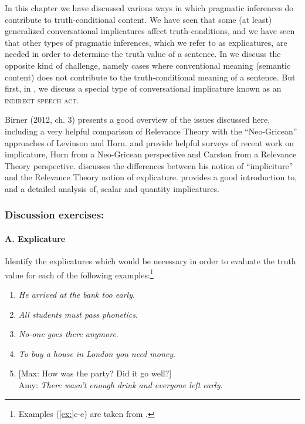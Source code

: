 In this chapter we have discussed various ways in which pragmatic inferences do contribute to truth-conditional content. We have seen that some (at least) generalized conversational implicatures affect truth-conditions, and we have seen that other types of pragmatic inferences, which we refer to as explicatures, are needed in order to determine the truth value of a sentence. In  we discuss the opposite kind of challenge, namely cases where conventional meaning (semantic content) does not contribute to the truth-conditional meaning of a sentence. But first, in , we discuss a special type of conversational implicature known as an \textsc{indirect speech act}.



\furtherreading



Birner (2012, ch. 3) presents a good overview of the issues discussed here, including a very helpful comparison of Relevance Theory with the “Neo-Gricean” approaches of Levinson and Horn. \citet{Horn2004} and \citet{Carston2004} provide helpful surveys of recent work on implicature, Horn from a Neo-Gricean perspective and Carston from a Relevance Theory perspective. \citet{Bach2010} discusses the differences between his notion of “impliciture” and the Relevance Theory notion of explicature. \citet{Geurts2011} provides a good introduction to, and a detailed analysis of, scalar and quantity implicatures.


\subsubsection{Discussion exercises:}\label{sec:}
\paragraph{A. Explicature}

Identify the explicatures which would be necessary in order to evaluate the truth value for each of the following examples:\footnote{Examples (\ref{ex:}c-e) are taken from \citet{CarstonHall2012}.}

\begin{enumerate}
\item \textit{He arrived at the bank too early}.
\item \textit{All students must pass phonetics}.
\item \textit{No-one goes there anymore}.
\item \textit{To buy a house in London you need money}.
\item {}[Max: How was the party? Did it go well?]\\
  Amy: \textit{There wasn’t enough drink and everyone left early}.
\end{enumerate}
